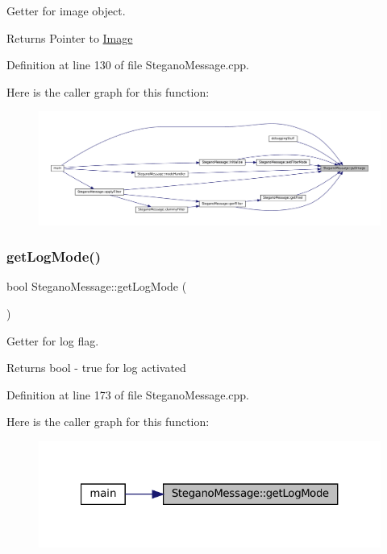 Getter for image object. 

\begin{DoxyReturn}{Returns}
Pointer to \mbox{\hyperlink{classImage}{Image}} 
\end{DoxyReturn}


Definition at line 130 of file Stegano\+Message.\+cpp.

Here is the caller graph for this function\+:
\nopagebreak
\begin{figure}[H]
\begin{center}
\leavevmode
\includegraphics[width=350pt]{classSteganoMessage_a2e3ad705a0219edfd2150f3f7931979c_icgraph}
\end{center}
\end{figure}
\mbox{\label{classSteganoMessage_ab560ec6c0d3e99c19822ca1119a68b92}} 
\subsubsection{\texorpdfstring{getLogMode()}{getLogMode()}}
{\footnotesize\ttfamily bool Stegano\+Message\+::get\+Log\+Mode (\begin{DoxyParamCaption}{ }\end{DoxyParamCaption})}



Getter for log flag. 

\begin{DoxyReturn}{Returns}
bool -\/ true for log activated 
\end{DoxyReturn}


Definition at line 173 of file Stegano\+Message.\+cpp.

Here is the caller graph for this function\+:
\nopagebreak
\begin{figure}[H]
\begin{center}
\leavevmode
\includegraphics[width=321pt]{classSteganoMessage_ab560ec6c0d3e99c19822ca1119a68b92_icgraph}
\end{center}
\end{figure}
\mbox{\label{classSteganoMessage_ad29978e925056ad70dc5c45b1e1681eb}} 
